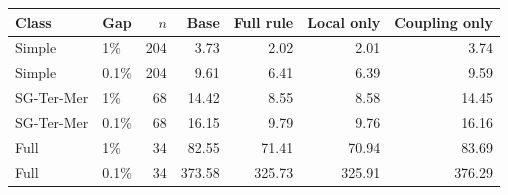 \begin{tabular}{llrrrrr}
\toprule
Class & Gap & $n$ & Base & Full rule & Local only & Coupling only \\
\midrule
Simple & 1\% & 204 & 3.73 & 2.02 & 2.01 & 3.74 \\
Simple & 0.1\% & 204 & 9.61 & 6.41 & 6.39 & 9.59 \\
SG-Ter-Mer & 1\% & 68 & 14.42 & 8.55 & 8.58 & 14.45 \\
SG-Ter-Mer & 0.1\% & 68 & 16.15 & 9.79 & 9.76 & 16.16 \\
Full & 1\% & 34 & 82.55 & 71.41 & 70.94 & 83.69 \\
Full & 0.1\% & 34 & 373.58 & 325.73 & 325.91 & 376.29 \\
\bottomrule
\end{tabular}
